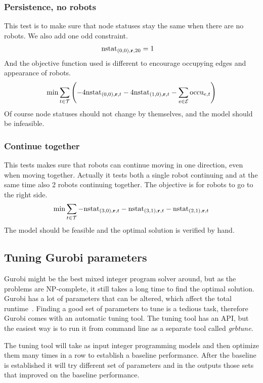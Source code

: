\subsubsection{Persistence, no robots}
This test is to make sure that node statuses stay the same when there are no
robots.
We also add one odd constraint.
\begin{align}
    \mathrm{nstat}_{(0,0),\text{\bf r},20} &= 1
\end{align}
And the objective function used is different to encourage occupying edges and
appearance of robots.
\begin{align}
    \min \sum_{t \in \mathcal{T}}\left( -4\mathrm{nstat}_{(0,0), \text{\bf r}, t}
    -4\mathrm{nstat}_{(1,0),\text{\bf r},t} -\sum_{e \in \mathcal{E}} \mathrm{occu}_{e,t} \right)
\end{align}
Of course node statuses should not change by themselves, and the model should be
infeasible.

\subsubsection{Continue together}
This tests makes sure that robots can continue moving in one direction, even
when moving together. Actually it tests both a single robot continuing and at
the same time also 2 robots continuing together.
The objective is for robots to go to the right side.
\begin{align}
    \min \sum_{t \in \mathcal{T}} -\mathrm{nstat}_{(3,0), \text{\bf r}, t} -\mathrm{nstat}_{(3,1),\text{\bf r},t} -\mathrm{nstat}_{(2,1),\text{\bf r},t}
\end{align}
The model should be feasible and the optimal solution is verified by hand.

\subsection{Tuning Gurobi parameters}
Gurobi might be the best mixed integer program solver around, but as the
problems are NP-complete, it still takes a long time to find the optimal
solution. Gurobi has a lot of parameters that can be altered, which affect the
total runtime~\cite{gurobiparams}. Finding a good set of parameters to tune is
a tedious task, therefore Gurobi comes with an automatic tuning tool. The
tuning tool has an API, but the easiest way is to run it from command line as a
separate tool called \textit{grbtune}.

The tuning tool will take as input integer programming models and then optimize
them many times in a row to establish a baseline performance. After the
baseline is established it will try different set of parameters and in the
outputs those sets that improved on the baseline performance.

